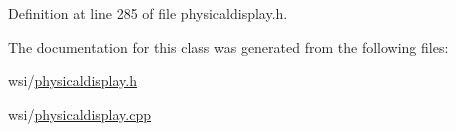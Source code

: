 Definition at line 285 of file physicaldisplay.\+h.



The documentation for this class was generated from the following files\+:\begin{DoxyCompactItemize}
\item 
wsi/\mbox{\hyperlink{physicaldisplay_8h}{physicaldisplay.\+h}}\item 
wsi/\mbox{\hyperlink{physicaldisplay_8cpp}{physicaldisplay.\+cpp}}\end{DoxyCompactItemize}

